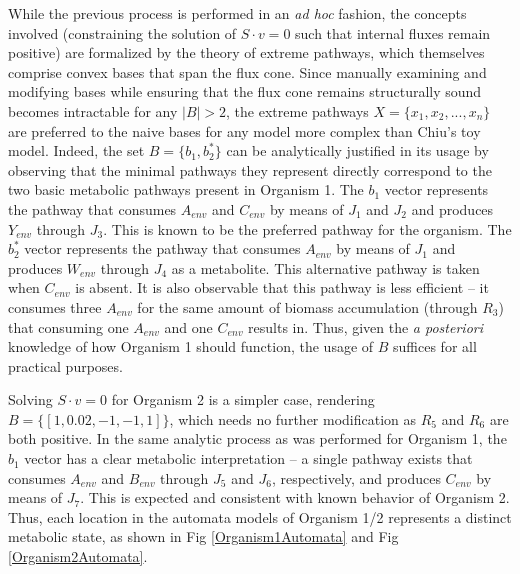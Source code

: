 While the previous process is performed in an \textit{ad hoc} fashion, the concepts involved (constraining the solution of $S \cdot v = 0$ such that internal fluxes remain positive) are formalized by the theory of extreme pathways, which themselves comprise convex bases that span the flux cone. Since manually examining and modifying bases while ensuring that the flux cone remains structurally sound becomes intractable for any $|B| > 2$, the extreme pathways $X = \{ x_1, x_2, ..., x_n \}$ are preferred to the naive bases for any model more complex than Chiu's toy model. Indeed, the set $B = \{ b_1, b_2^* \}$ can be analytically justified in its usage by observing that the minimal pathways they represent directly correspond to the two basic metabolic pathways present in Organism 1. The $b_1$ vector represents the pathway that consumes $A_{env}$ and $C_{env}$ by means of $J_1$ and $J_2$ and produces $Y_{env}$ through $J_{3}$. This is known to be the preferred pathway for the organism. The $b_2^*$ vector represents the pathway that consumes $A_{env}$ by means of $J_1$ and produces $W_{env}$ through $J_4$ as a metabolite. This alternative pathway is taken when $C_{env}$ is absent. It is also observable that this pathway is less efficient -- it consumes three $A_{env}$ for the same amount of biomass accumulation (through $R_3$) that consuming one $A_{env}$ and one $C_{env}$ results in. Thus, given the \textit{a posteriori} knowledge of how Organism 1 should function, the usage of $B$ suffices for all practical purposes.


Solving $S \cdot v = 0$ for Organism 2 is a simpler case, rendering $B = \{ [1, 0.02, -1, -1, 1] \}$, which needs no further modification as $R_5$ and $R_6$ are both positive. In the same analytic process as was performed for Organism 1, the $b_1$ vector has a clear metabolic interpretation -- a single pathway exists that consumes $A_{env}$ and $B_{env}$ through $J_5$ and $J_6$, respectively, and produces $C_{env}$ by means of $J_7$. This is expected and consistent with known behavior of Organism 2. Thus, each location in the automata models of Organism 1/2 represents a distinct metabolic state, as shown in Fig \ref{Organism1Automata} and Fig \ref{Organism2Automata}.

